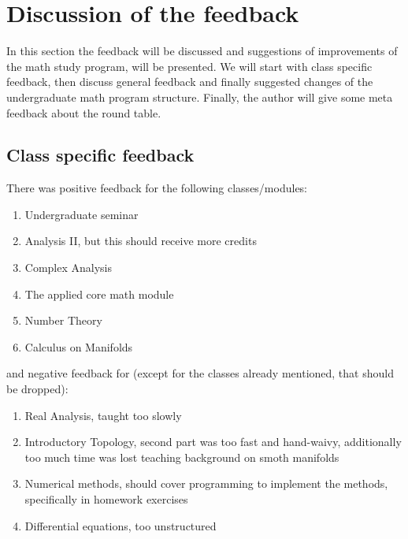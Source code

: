 \section{Discussion of the feedback}
\label{sec-1}
\label{sec:dis}
In this section the feedback will be discussed and suggestions of improvements of the math study program, will be presented. 
We will start with class specific feedback, then discuss general feedback and finally suggested changes of the undergraduate math program structure. 
Finally, the author will give some meta feedback about the round table.

\subsection{Class specific feedback}
\label{sec-1-1}
There was positive feedback for the following classes/modules:
\begin{enumerate}
\item Undergraduate seminar
\item Analysis II, but this should receive more credits
\item Complex Analysis
\item The applied core math module
\item Number Theory
\item Calculus on Manifolds
\end{enumerate}

and negative feedback for (except for the classes already mentioned, that should be dropped):
\begin{enumerate}
\item Real Analysis, taught too slowly
\item Introductory Topology, second part was too fast and hand-waivy, additionally too much time was lost teaching background on smoth manifolds
\item Numerical methods, should cover programming to implement the methods, specifically in homework exercises
\item Differential equations, too unstructured
\end{enumerate}


